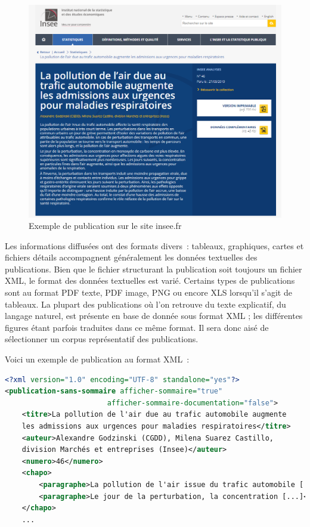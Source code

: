 \begin{figure}[H]
    \centering
    \includegraphics[scale=0.52]{images/insee-fr-exemple.png}
    \caption{Exemple de publication sur le site insee.fr}
    \label{fig:insee.fr}
\end{figure}

Les informations diffusées ont des formats divers~: tableaux, graphiques, cartes et fichiers détails accompagnent généralement les données textuelles des publications. Bien que le fichier structurant la publication soit toujours un fichier XML, le format des données textuelles est varié. Certains types de publications sont au format PDF texte, PDF image, PNG ou encore XLS lorsqu'il s'agit de tableaux. La plupart des publications où l'on retrouve du texte explicatif, du langage naturel, est présente en base de donnée sous format XML ; les différentes figures étant parfois traduites dans ce même format. Il sera donc aisé de sélectionner un corpus représentatif des publications. 
\newline

Voici un exemple de publication au format XML~: 

\begin{lstlisting}[language=XML, basicstyle=\small]
<?xml version="1.0" encoding="UTF-8" standalone="yes"?>
<publication-sans-sommaire afficher-sommaire="true"
                        afficher-sommaire-documentation="false">
	<titre>La pollution de l'air due au trafic automobile augmente 
	les admissions aux urgences pour maladies respiratoires</titre>
	<auteur>Alexandre Godzinski (CGDD), Milena Suarez Castillo, 
	division Marchés et entreprises (Insee)</auteur>
	<numero>46</numero>
	<chapo>
		<paragraphe>La pollution de l'air issue du trafic automobile [...]<paragraphe>
		<paragraphe>Le jour de la perturbation, la concentration [...]</paragraphe>
	</chapo>
	...
\end{lstlisting}

